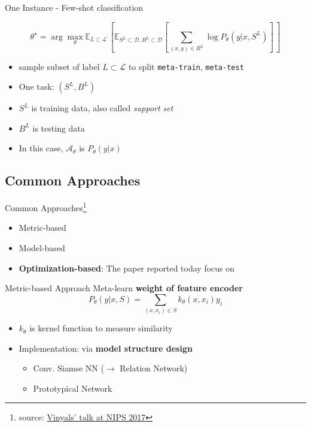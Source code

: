 \documentclass{beamer}
\begin{document}
\begin{frame}{One Instance - Few-shot classification}

  \[ \theta^\star = \arg \max_\theta \mathbb{E}_{L \subset \mathcal{L}} \, [ \mathbb{E}_{S^L \subset \mathcal{D}, B^L \subset \mathcal{D}}[\sum_{(x,y) \in B^L} \log P_\theta(y|x,S^L)] \,  ]\]

  \begin{itemize}
    \item sample subset of label $L \subset \mathcal{L}$ to split \texttt{meta-train}, \texttt{meta-test}
    \item One task: $(S^L, B^L)$ 
    \item $S^L$ is training data, also called \textit{support set}
    \item $B^L$ is testing data
    \item In this case, $\mathcal{A}_\theta$ is $P_\theta(y|x)$
  \end{itemize}
\end{frame}

\subsection{Common Approaches}
\begin{frame}{Common Approaches\footnote{source: \href{http://metalearning-symposium.ml/files/vinyals.pdf}{Vinyals' talk at NIPS 2017}}}
  \begin{itemize}
    \item Metric-based
    \item Model-based
    \item \textbf{Optimization-based}: The paper reported today focus on
  \end{itemize}
\end{frame}

\begin{frame}{Metric-based Approach}
  Meta-learn \textbf{weight of feature encoder}
  \[ P_\theta (y|x,S) = \sum_{(x,x_i) \in S} k_\theta (x,x_i) y_i \]
  \begin{itemize}
    \item $k_\theta$ is kernel function to measure similarity
    \item Implementation: via \textbf{model structure design}
      \begin{itemize}
        \item Conv. Siamse NN ($\rightarrow$ Relation Network)
        \item Prototypical Network
      \end{itemize}
  \end{itemize}
\end{frame}
\end{document}
